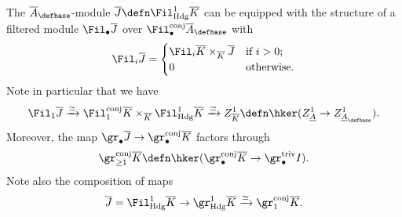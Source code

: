 \documentclass[10pt]{amsart}
\begin{document}
\begin{remark}
The $\overline{A}_\defbase$-module $\overline{J} \defn \Fil^1_{\mathrm{Hdg}}\overline{K}$ can be equipped with the structure of a filtered module $\Fil_\bullet\overline{J}$ over $\Fil^{\mathrm{conj}}_\bullet\overline{A}_\defbase$ with
\[
\Fil_i\overline{J} = \begin{cases}
\Fil_i\overline{K}\times_{\overline{K}}\overline{J}&\text{if $i>0$};\\
0&\text{otherwise}.
\end{cases}
\]
Note in particular that we have
\begin{align*}
\Fil_1\overline{J} \xrightarrow{\simeq} \Fil_1^{\mathrm{conj}}\overline{K}\times_{\overline{K}}\Fil^1_{\mathrm{Hdg}}\overline{K}\xrightarrow{\simeq}Z^1_{\overline{K}} \defn \hker(Z^1_{\underline{A}}\to Z^1_{\underline{A}_\defbase}).
\end{align*}
Moreover, the map $\gr_\bullet\overline{J}\to \gr^{\mathrm{conj}}_\bullet\overline{K}$ factors through 
\[
\gr^{\mathrm{conj}}_{\ge 1}\overline{K} \defn \hker(\gr^{\mathrm{conj}}_\bullet\overline{K}\to \gr^{\mathrm{triv}}_\bullet I).
\]
Note also the composition of maps
\begin{align}\label{eqn:barJ_fil1_map}
\overline{J} = \Fil^1_{\mathrm{Hdg}}\overline{K} \to \gr^1_{\mathrm{Hdg}}\overline{K}\xrightarrow{\simeq}\gr_1^{\mathrm{conj}}\overline{K}.
\end{align}
\end{remark} 
\end{document}
